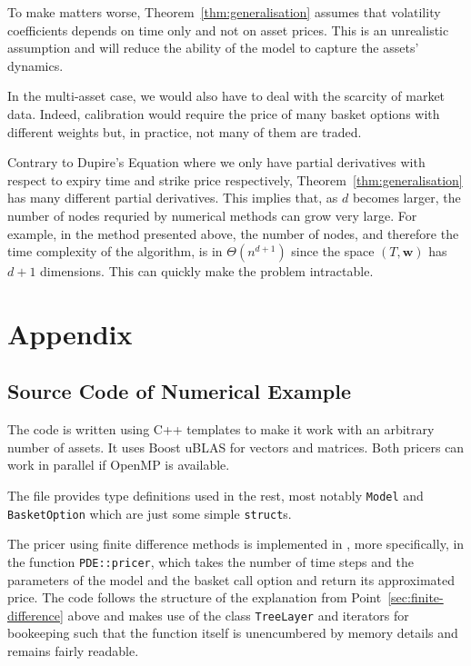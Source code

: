 \documentclass[english]{article}
\newcommand{\comment}[1]{\color{blue}#1\color{black}}
\numberwithin{equation}{section}
\numberwithin{figure}{section}
\theoremstyle{bolddescit}
\theoremstyle{definition}
\theoremstyle{definition}
\theoremstyle{plain}
\theoremstyle{plain}
\theoremstyle{bolddesc}
\theoremstyle{plain}
\theoremstyle{remark}
\begin{document}
To make matters worse, Theorem~\ref{thm:generalisation} assumes that volatility coefficients depends on time only and not on asset prices. This is an unrealistic assumption and will reduce the ability of the model to capture the assets' dynamics.

In the multi-asset case, we would also have to deal with the scarcity of market data. Indeed, calibration would require the price of many basket options with different weights but, in practice, not many of them are traded.

Contrary to Dupire's Equation where we only have partial derivatives with respect to expiry time and strike price respectively, Theorem~\ref{thm:generalisation} has many different partial derivatives. This implies that, as $d$ becomes larger, the number of nodes requried by numerical methods can grow very large. For example, in the method presented above, the number of nodes, and therefore the time complexity of the algorithm, is in $\Theta(n^{d+1})$ since the space $(T,\mathbf{w})$ has $d+1$ dimensions. This can quickly make the problem intractable.


\pagebreak
\appendix
\section{Appendix}

\subsection{Source Code of Numerical Example}

The code is written using C++ templates to make it work with an arbitrary number of assets. It uses Boost uBLAS for vectors and matrices. Both pricers can work in parallel if OpenMP is available.

The file  provides type definitions used in the rest, most notably \texttt{Model} and \texttt{BasketOption} which are just some simple \texttt{struct}s.

The pricer using finite difference methods is implemented in , more specifically, in the function \texttt{PDE::pricer}, which takes the number of time steps and the parameters of the model and the basket call option and return its approximated price. The code follows the structure of the explanation from Point~\ref{sec:finite-difference} above and makes use of the class \texttt{TreeLayer} and iterators for bookeeping such that the function itself is unencumbered by memory details and remains fairly readable.
\end{document}
